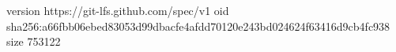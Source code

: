 version https://git-lfs.github.com/spec/v1
oid sha256:a66fbb06ebed83053d99dbacfe4afdd70120e243bd024624f63416d9cb4fc938
size 753122

